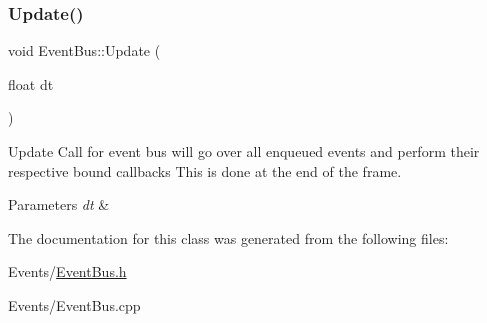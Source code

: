 \subsubsection{\texorpdfstring{Update()}{Update()}}
{\footnotesize\ttfamily void Event\+Bus\+::\+Update (\begin{DoxyParamCaption}\item[{float}]{dt }\end{DoxyParamCaption})}



Update Call for event bus will go over all enqueued events and perform their respective bound callbacks This is done at the end of the frame. 


\begin{DoxyParams}{Parameters}
{\em dt} & \\
\hline
\end{DoxyParams}


The documentation for this class was generated from the following files\+:\begin{DoxyCompactItemize}
\item 
Events/\hyperlink{EventBus_8h}{Event\+Bus.\+h}\item 
Events/Event\+Bus.\+cpp\end{DoxyCompactItemize}

